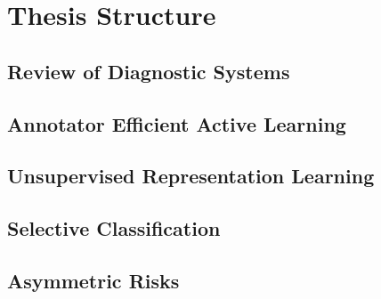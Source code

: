 \section{Thesis Structure}
\label{sec:thesis_structure}

\subsection*{Review of Diagnostic Systems}

\subsection*{Annotator Efficient Active Learning}

\subsection*{Unsupervised Representation Learning}

\subsection*{Selective Classification}

\subsection*{Asymmetric Risks}
